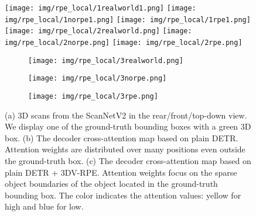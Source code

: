 \documentclass[10pt,twocolumn,letterpaper]{article}
\begin{document}
\begin{figure}[t]
\centering
\texttt{[image: img/rpe\_local/1realworld1.png]}
\hfill
\texttt{[image: img/rpe\_local/1norpe1.png]}
\hfill
\texttt{[image: img/rpe\_local/1rpe1.png]} \\
\texttt{[image: img/rpe\_local/2realworld.png]}
\hfill
\texttt{[image: img/rpe\_local/2norpe.png]}
\hfill
\texttt{[image: img/rpe\_local/2rpe.png]} \\
\begin{subfigure}[b]{0.3\linewidth}
\centering
\texttt{[image: img/rpe\_local/3realworld.png]}
\caption{}
\end{subfigure}
\hfill
\begin{subfigure}[b]{0.3\linewidth}
\centering
\texttt{[image: img/rpe\_local/3norpe.png]}
\caption{}
\end{subfigure}
\hfill
\begin{subfigure}[b]{0.3\linewidth}
\centering
\texttt{[image: img/rpe\_local/3rpe.png]} 
\caption{}
\end{subfigure}

\caption{\small{
(a) 3D scans from the ScanNetV2 in the rear/front/top-down view. 
We display one of the ground-truth bounding boxes with a green 3D box.
(b) The decoder cross-attention map based on plain DETR. Attention weights are distributed over many positions even outside the ground-truth box.
(c) The decoder cross-attention map based on plain DETR + 3DV-RPE. Attention weights focus on the sparse object boundaries of the object located in the ground-truth bounding box.
The color indicates the attention values: yellow for high and blue for low.
}}
\label{fig:attention_maps_intro}
\vspace{-5mm}
\end{figure}
\end{document}
